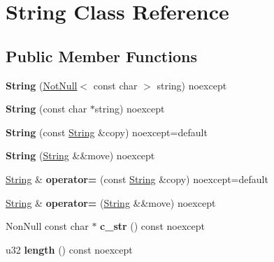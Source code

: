 \hypertarget{class_string}{}\section{String Class Reference}
\label{class_string}
\subsection*{Public Member Functions}
\begin{DoxyCompactItemize}
\item 
\mbox{\label{class_string_a227778609438ca052a4b7f325c1f0502}} 
{\bfseries String} (\mbox{\hyperlink{class_not_null}{Not\+Null}}$<$ const char $>$ string) noexcept
\item 
\mbox{\label{class_string_a4b39c4282829506796cf9c1d09538b6c}} 
{\bfseries String} (const char $\ast$string) noexcept
\item 
\mbox{\label{class_string_a4f8f3179fcb176ac3d204094426a5ada}} 
{\bfseries String} (const \mbox{\hyperlink{class_string}{String}} \&copy) noexcept=default
\item 
\mbox{\label{class_string_add2fb3ec45b7fe597bae40ed09ee0785}} 
{\bfseries String} (\mbox{\hyperlink{class_string}{String}} \&\&move) noexcept
\item 
\mbox{\label{class_string_ab509631465fd32f0e1ec84d7087a304f}} 
\mbox{\hyperlink{class_string}{String}} \& {\bfseries operator=} (const \mbox{\hyperlink{class_string}{String}} \&copy) noexcept=default
\item 
\mbox{\label{class_string_a374418081acd87d867367ae823861ee0}} 
\mbox{\hyperlink{class_string}{String}} \& {\bfseries operator=} (\mbox{\hyperlink{class_string}{String}} \&\&move) noexcept
\item 
\mbox{\label{class_string_a8fe82324a99bae66cab74d308fe22e1d}} 
Non\+Null const char $\ast$ {\bfseries c\+\_\+str} () const noexcept
\item 
\mbox{\label{class_string_a5f96a6ada25cdf853b7a1f39783ce64d}} 
u32 {\bfseries length} () const noexcept
\item 

\end{DoxyCompactItemize}
